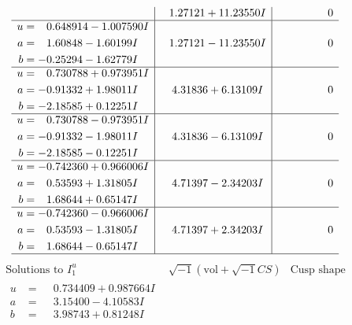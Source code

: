 \documentclass[1p]{elsarticle_modified}
\theoremstyle{definition}
\newcommand{\I}{\sqrt{-1}}
\begin{document}
$$\begin{array}{c|c|c}
 & \phantom{-}1.27121 + 11.23550 I & \phantom{-0.000000 } 0 \\ \hline\begin{aligned}
u &= \phantom{-}0.648914 - 1.007590 I \\
a &= \phantom{-}1.60848 - 1.60199 I \\
b &= -0.25294 - 1.62779 I\end{aligned}
 & \phantom{-}1.27121 - 11.23550 I & \phantom{-0.000000 } 0 \\ \hline\begin{aligned}
u &= \phantom{-}0.730788 + 0.973951 I \\
a &= -0.91332 + 1.98011 I \\
b &= -2.18585 + 0.12251 I\end{aligned}
 & \phantom{-}4.31836 + 6.13109 I & \phantom{-0.000000 } 0 \\ \hline\begin{aligned}
u &= \phantom{-}0.730788 - 0.973951 I \\
a &= -0.91332 - 1.98011 I \\
b &= -2.18585 - 0.12251 I\end{aligned}
 & \phantom{-}4.31836 - 6.13109 I & \phantom{-0.000000 } 0 \\ \hline\begin{aligned}
u &= -0.742360 + 0.966006 I \\
a &= \phantom{-}0.53593 + 1.31805 I \\
b &= \phantom{-}1.68644 + 0.65147 I\end{aligned}
 & \phantom{-}4.71397 - 2.34203 I & \phantom{-0.000000 } 0 \\ \hline\begin{aligned}
u &= -0.742360 - 0.966006 I \\
a &= \phantom{-}0.53593 - 1.31805 I \\
b &= \phantom{-}1.68644 - 0.65147 I\end{aligned}
 & \phantom{-}4.71397 + 2.34203 I & \phantom{-0.000000 } 0\\
 \hline 
 \end{array}$$\newpage$$\begin{array}{c|c|c}  
\text{Solutions to }I^u_{1}& \I (\text{vol} + \sqrt{-1}CS) & \text{Cusp shape}\\
 \hline 
\begin{aligned}
u &= \phantom{-}0.734409 + 0.987664 I \\
a &= \phantom{-}3.15400 - 4.10583 I \\
b &= \phantom{-}3.98743 + 0.81248 I\end{aligned}

\end{array}$$
\end{document}
